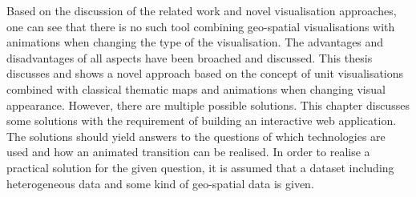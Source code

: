 Based on the discussion of the related work and novel visualisation approaches, one can see that there is no such tool combining geo-spatial visualisations with animations when changing the type of the visualisation. The advantages and disadvantages of all aspects have been broached and discussed. This thesis discusses and shows a novel approach based on the concept of unit visualisations combined with classical thematic maps and animations when changing visual appearance. However, there are multiple possible solutions. This chapter discusses some solutions with the requirement of building an interactive web application. The solutions should yield answers to the questions of which technologies are used and how an animated transition can be realised. In order to realise a practical solution for the given question, it is assumed that a dataset including heterogeneous data and some kind of geo-spatial data is given.

